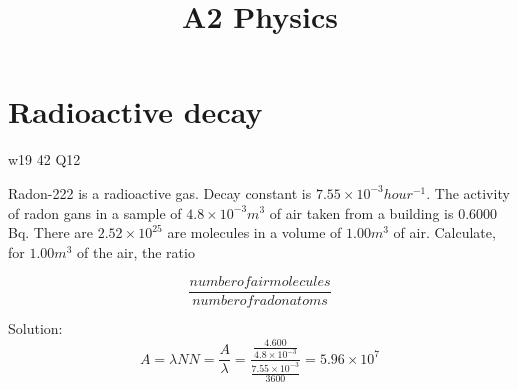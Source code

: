 \documentclass[a4paper,9pt]{scrartcl}
\title{A2 Physics}
\begin{document}
    \section{Radioactive decay}
    w19 42 Q12

    Radon-222 is a radioactive gas. Decay constant is $7.55 \times 10^{-3} hour^{-1}$. The activity of radon gans in a sample of $4.8\times 10^{-3}m^3$ of air taken from a building is $0.6000$Bq.
    \newline There are $2.52\times 10^{25}$ are molecules in a volume of $1.00 m^3$ of air.
    \newline Calculate, for $1.00 m^3$ of the air, the ratio

    \newline

    \begin{displaymath}
        \frac{number of air molecules}{number of radon atoms}
    \end{displaymath}

    Solution:
    \begin{displaymath}
        A={\lambda}N
        N=\frac{A}{\lambda}=\frac{\frac{4.600}{4.8\times 10^{-3}}}{\frac{7.55\times 10^{-3}}{3600}} =5.96\times 10^7
    \end{displaymath}
\end{document}
